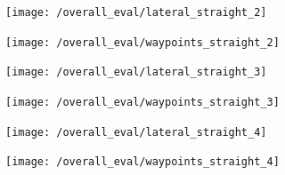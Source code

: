\documentclass[titlepage,draft]{article}
\begin{document}
{\begin{figure}[H]
	\centering
	\begin{minipage}{.45\textwidth}
		\centering
		\texttt{[image: /overall\_eval/lateral\_straight\_2]}
		\label{fig:straight_lat_2}
	\end{minipage}%
	\hspace{0.1\textwidth}%
	\begin{minipage}{.45\textwidth}
		\centering
		\texttt{[image: /overall\_eval/waypoints\_straight\_2]}
		\label{fig:straight_way_2}
	\end{minipage}
\end{figure}

\begin{figure}[H]
	\centering
	\begin{minipage}{.45\textwidth}
		\centering
		\texttt{[image: /overall\_eval/lateral\_straight\_3]}
		\label{fig:straight_lat_3}
	\end{minipage}%
	\hspace{0.1\textwidth}%
	\begin{minipage}{.45\textwidth}
		\centering
		\texttt{[image: /overall\_eval/waypoints\_straight\_3]}
		\label{fig:straight_way_3}
	\end{minipage}
\end{figure}

\begin{figure}[H]
	\centering
	\begin{minipage}{.45\textwidth}
		\centering
		\texttt{[image: /overall\_eval/lateral\_straight\_4]}
		\label{fig:straight_lat_4}
	\end{minipage}%
	\hspace{0.1\textwidth}%
	\begin{minipage}{.45\textwidth}
		\centering
		\texttt{[image: /overall\_eval/waypoints\_straight\_4]}
		\label{fig:straight_way_4}
	\end{minipage}
\end{figure}

}
\end{document}
